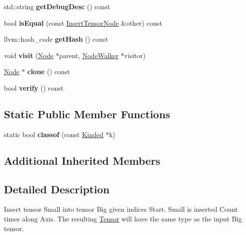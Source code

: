 \begin{DoxyCompactItemize}
std\+::string {\bfseries get\+Debug\+Desc} () const
\item 
\mbox{\label{classglow_1_1_insert_tensor_node_a51e13397c5abe16f850483d7a2dafa69}} 
bool {\bfseries is\+Equal} (const \hyperlink{classglow_1_1_insert_tensor_node}{Insert\+Tensor\+Node} \&other) const
\item 
\mbox{\label{classglow_1_1_insert_tensor_node_aceddce0cf8b611ba075a1fd47e2446e6}} 
llvm\+::hash\+\_\+code {\bfseries get\+Hash} () const
\item 
\mbox{\label{classglow_1_1_insert_tensor_node_a834a0c99767d7c1eff1ecf4d8beb2680}} 
void {\bfseries visit} (\hyperlink{classglow_1_1_node}{Node} $\ast$parent, \hyperlink{classglow_1_1_node_walker}{Node\+Walker} $\ast$visitor)
\item 
\mbox{\label{classglow_1_1_insert_tensor_node_acf06e812e3624ec4940d31e733187e12}} 
\hyperlink{classglow_1_1_node}{Node} $\ast$ {\bfseries clone} () const
\item 
\mbox{\label{classglow_1_1_insert_tensor_node_a79c003dd3c585d69daaa56f766a37828}} 
bool {\bfseries verify} () const
\end{DoxyCompactItemize}
\subsection*{Static Public Member Functions}
\begin{DoxyCompactItemize}
\item 
\mbox{\label{classglow_1_1_insert_tensor_node_a5a32a81845c75c9fa2fc5f70640586a6}} 
static bool {\bfseries classof} (const \hyperlink{classglow_1_1_kinded}{Kinded} $\ast$k)
\end{DoxyCompactItemize}
\subsection*{Additional Inherited Members}


\subsection{Detailed Description}
Insert tensor Small into tensor Big given indices Start. Small is inserted Count times along Axis. The resulting \hyperlink{classglow_1_1_tensor}{Tensor} will have the same type as the input Big tensor. 

